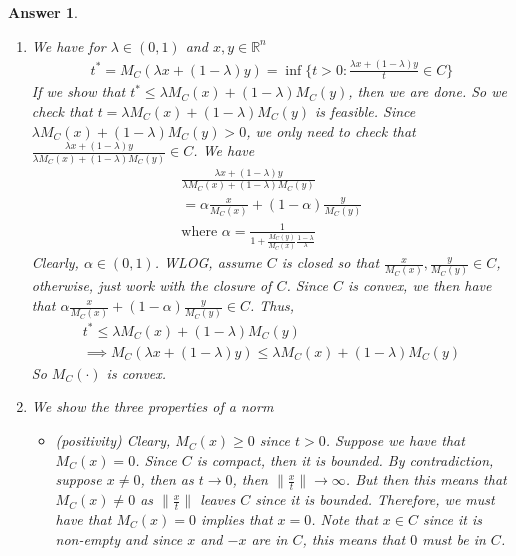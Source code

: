 \documentclass[12pt]{article}
\theoremstyle{colon}
\newtheorem*{answer}{Answer}
\begin{document}
\begin{answer}
  \leavevmode
  \begin{enumerate}[label=\arabic*)]
    \item We have for $\lambda \in (0,1)$ and $x, y \in \mathbb{R}^n$
      \begin{gather*}
        t^* = M_C(\lambda x + (1-\lambda) y) = \inf \{ t > 0 : \frac{\lambda x + (1-\lambda) y}{t} \in C \}
      \end{gather*}
      If we show that $t^* \leq \lambda M_C(x) + (1-\lambda)M_C(y)$, then we are done. So we check that $t = \lambda M_C(x) + (1-\lambda)M_C(y)$ is feasible. Since $\lambda M_C(x) + (1-\lambda)M_C(y) > 0$, we only need to check that $\frac{\lambda x + (1-\lambda) y}{\lambda M_C(x) + (1-\lambda)M_C(y)} \in C$. We have
      \begin{gather*}
        \frac{\lambda x + (1-\lambda) y}{\lambda M_C(x) + (1-\lambda)M_C(y)} \\
        = \alpha \frac{x}{M_C(x)} + (1-\alpha) \frac{y}{M_C(y)} \\
        \text{where } \alpha = \frac{1}{1 + \frac{M_C(y)}{M_C(x)} \frac{1-\lambda}{\lambda}}
      \end{gather*}
      Clearly, $\alpha \in (0,1)$. WLOG, assume $C$ is closed so that $\frac{x}{M_C(x)}, \frac{y}{M_C(y)} \in C$, otherwise, just work with the closure of $C$. Since $C$ is convex, we then have that $\alpha \frac{x}{M_C(x)} + (1-\alpha) \frac{y}{M_C(y)} \in C$. Thus,
      \begin{gather*}
        t^* \leq \lambda M_C(x) + (1-\lambda)M_C(y) \\
        \implies M_C(\lambda x + (1-\lambda) y) \leq \lambda M_C(x) + (1-\lambda)M_C(y)
      \end{gather*}
      So $M_C(\cdot)$ is convex.

    \item We show the three properties of a norm
      \begin{itemize}
        \item (positivity) Cleary, $M_C(x) \geq 0$ since $t > 0$. Suppose we have that $M_C(x) = 0$. Since $C$ is compact, then it is bounded. By contradiction, suppose $x \neq 0$, then as $t \rightarrow 0$, then $\lVert \frac{x}{t} \rVert \rightarrow \infty$. But then this means that $M_C(x) \neq 0$ as $\lVert \frac{x}{t} \rVert$ leaves $C$ since it is bounded. Therefore, we must have that $M_C(x) = 0$ implies that $x = 0$. Note that $x \in C$ since it is non-empty and since $x$ and $-x$ are in $C$, this means that $0$ must be in $C$.


\end{itemize}
\end{enumerate}
\end{answer}
\end{document}
